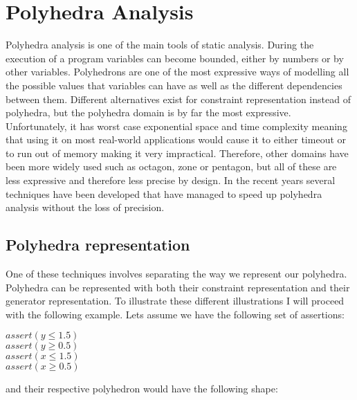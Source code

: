 
\chapter{Polyhedra Analysis}
 
Polyhedra analysis is one of the main tools of static analysis. During the execution of a program variables can become bounded, either by numbers or by other variables. Polyhedrons are one of the most expressive ways of modelling all the possible values that variables can have as well as the different dependencies between them. Different alternatives exist for constraint representation instead of polyhedra, but the polyhedra domain is by far the most expressive. Unfortunately, it has worst case exponential space and time complexity meaning that using it on most real-world applications would cause it to either timeout or to run out of memory making it very impractical. Therefore, other domains have been more widely used such as octagon, zone or pentagon, but all of these are less expressive and therefore less precise by design. In the recent years several techniques have been developed that have managed to speed up polyhedra analysis without the loss of precision.

\section{Polyhedra representation}
One of these techniques involves separating the way we represent our polyhedra. Polyhedra can be represented with both their constraint representation and their generator representation. To illustrate these different illustrations I will proceed with the following example. Lets assume we have the following set of assertions:
\begin{center}
	$assert(y\leq1.5)$\\
	$assert(y\geq 0.5)$\\
	$assert(x\leq1.5)$\\
	$assert(x\geq0.5)$
\end{center}
and their respective polyhedron would have the following shape:


